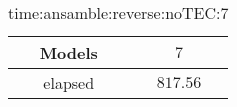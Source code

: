 \begin{table}[!ht]
	\centering
	\begin{tabular}{|c|c|}
		\hline
		Models & $7$ \\ \hline
		elapsed & $817.56$ \\ \hline
	\end{tabular}
	\caption{time:ansamble:reverse:noTEC:7}
	\label{tab:time:ansamble:reverse:noTEC:7}
\end{table}
